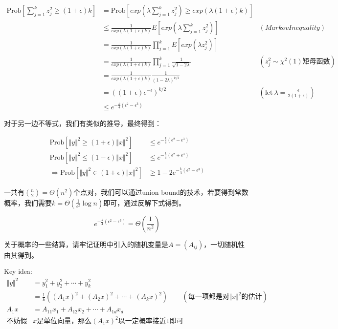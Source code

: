 \documentclass[lang=cn,newtx,10pt,scheme=chinese,chinesefont=nofont,citestyle=gb7714-2015, bibstyle=gb7714-2015]{elegantbook}
\begin{document}
\begin{refsection}
\begin{align*}
	\mathrm{Prob}\left[\sum_{j=1}^{k}z_j^2 \ge (1+\epsilon)k \right]&=\mathrm{Prob}\left[exp(\lambda\sum_{j=1}^{k}z_j^2) \ge exp(\lambda(1+\epsilon)k)\right]\\
	&\le\frac{1}{exp(\lambda(1+\epsilon)k)}E\left[exp(\lambda\sum_{j=1}^{k}z_j^2)\right]&(Markov Inequality)\\
	&=\frac{1}{exp(\lambda(1+\epsilon)k)}\prod_{j=1}^{k}E\left[exp(\lambda z_j^2)\right]\\
	&=\frac{1}{exp(\lambda(1+\epsilon)k)}\prod_{j=1}^{k}\frac{1}{\sqrt{1-2\lambda}}&(z_j^2\sim \chi^2(1)\text{矩母函数})\\
	&=\frac{1}{exp(\lambda(1+\epsilon)k)}\frac{1}{(1-2\lambda)^{k/2}}\\
	&=((1+\epsilon)e^{-\epsilon})^{k/2}&(\mathrm{let}\ \lambda = \frac{\epsilon}{2(1+\epsilon)})\\
	&\le e^{-\frac{k}{4}(\epsilon^2-\epsilon^3)}
\end{align*}

对于另一边不等式，我们有类似的推导，最终得到：

\begin{align*}
	\mathrm{Prob}\left[\Vert y\Vert^2\ge(1+\epsilon)\Vert x \Vert^2 \right] &\le e^{-\frac{k}{4}(\epsilon^2-\epsilon^3)}\\
	\mathrm{Prob}\left[\Vert y\Vert^2\le(1-\epsilon)\Vert x \Vert^2 \right] &\le e^{-\frac{k}{4}(\epsilon^2+\epsilon^3)}\\
	\Rightarrow \mathrm{Prob}\left[\Vert y\Vert^2\in(1\pm\epsilon)\Vert x \Vert^2 \right] &\ge 1-2e^{-\frac{k}{4}(\epsilon^2-\epsilon^3)}
\end{align*}

一共有$\binom{n}{2}=\Theta(n^2)$个点对，我们可以通过union bound的技术，若要得到常数概率，我们需要$k=\Theta(\frac{1}{\epsilon^2}\log n)$即可，通过反解下式得到。

\begin{equation*}
	e^{-\frac{k}{4}(\epsilon^2-\epsilon^3)}=\Theta(\frac{1}{n^2})
\end{equation*}

\begin{remark}
	关于概率的一些结算，请牢记证明中引入的随机变量是$A=(A_{ij})$，一切随机性由其得到。
\end{remark}

\begin{remark}{Key idea:}
	\begin{align*}
		\Vert y \Vert^2 &= y_1^2+y_2^2+\cdots+y_k^2\\
		&= \frac 1 k ((A_1x)^2+(A_2x)^2+\cdots+(A_kx)^2)&(\text{每一项都是对}\Vert x \Vert^2\text{的估计})\\
		A_1x &= A_{11}x_1+A_{12}x_2+\cdots+A_{1d}x_d\\
		\text{不妨假设}&x\text{是单位向量，那么}(A_1x)^2\text{以一定概率接近1即可}
	\end{align*}
\end{remark}




\end{refsection}
\end{document}
